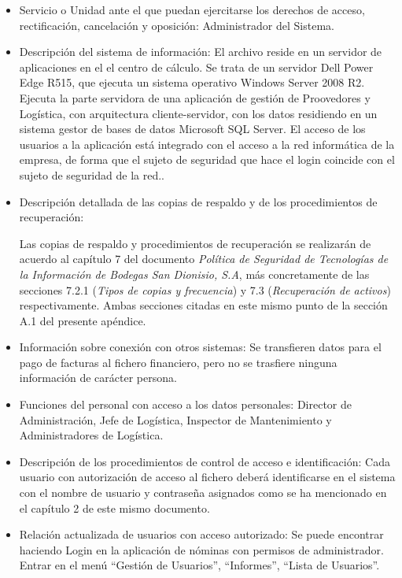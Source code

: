 \documentclass[a4paper,11pt,bibtotoc,noliststotoc]{scrbook}
\begin{document}
\begin{itemize}
\item Servicio o Unidad ante el que puedan ejercitarse los derechos de acceso, rectificación, cancelación y oposición: Administrador del Sistema.

\item Descripción del sistema de información: El archivo reside en un servidor de aplicaciones en el el centro de cálculo. Se trata de un servidor Dell Power Edge R515, que ejecuta un sistema operativo Windows Server 2008 R2. Ejecuta la parte servidora de una aplicación de gestión de Proovedores y Logística, con arquitectura cliente-servidor, con los datos residiendo en un sistema gestor de bases de datos Microsoft SQL Server. El acceso de los usuarios a la aplicación está integrado con el acceso a la red informática de la empresa, de forma que el sujeto de seguridad que hace el login coincide con el sujeto de seguridad de la red..

\item Descripción detallada de las copias de respaldo y de los procedimientos de recuperación:

Las copias de respaldo y procedimientos de recuperación se realizarán de acuerdo al capítulo 7 del documento \emph{Política de Seguridad de Tecnologías de la Información de Bodegas San Dionisio, S.A}, más concretamente de las secciones 7.2.1 (\emph{Tipos de copias y frecuencia}) y 7.3 (\emph{Recuperación de activos}) respectivamente. Ambas secciones citadas en este mismo punto de la sección A.1 del presente apéndice.

\item Información sobre conexión con otros sistemas: Se transfieren datos para el pago de facturas al fichero financiero, pero no se trasfiere ninguna información de carácter persona.

\item Funciones del personal con acceso a los datos personales: Director de Administración, Jefe de Logística, Inspector de Mantenimiento y Administradores de Logística.

\item Descripción de los procedimientos de control de acceso e identificación: Cada usuario con autorización de acceso al fichero deberá identificarse en el sistema con el nombre de usuario y contraseña asignados como se ha mencionado en el capítulo 2 de este mismo documento.

\item Relación actualizada de usuarios con acceso autorizado: Se puede encontrar haciendo Login en la aplicación de nóminas con permisos de administrador. Entrar en el menú "`Gestión de Usuarios"', "`Informes"', "`Lista de Usuarios"'.


\end{itemize}
\end{document}

